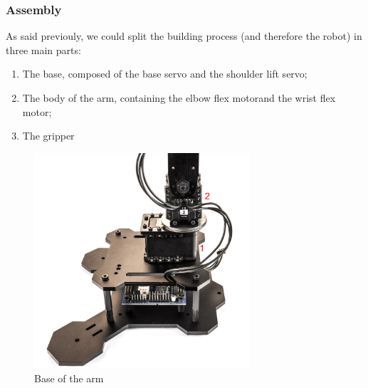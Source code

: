 \documentclass[aps,letterpaper,11pt]{revtex4}
\begin{document}
\subsubsection{Assembly}

As said previouly, we could split the building process (and therefore the robot) in three main parts:
\begin{enumerate}
\item The base, composed of the base servo and the shoulder lift servo;
\item The body of the arm, containing the elbow flex motorand the wrist flex motor;
\item The gripper
\end{enumerate}
\begin{figure}[h]
	\centering
	\includegraphics[height=8cm]{wire4.jpg}
	\caption{Base of the arm}
	\label{fig:Base}    
\end{figure}
\end{document}
